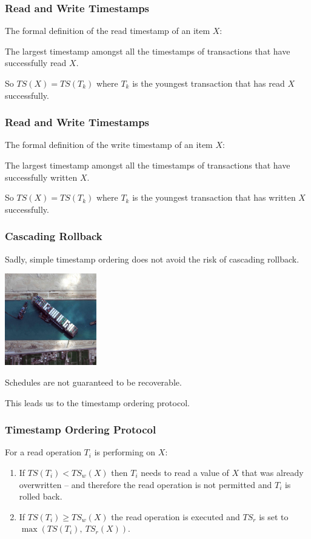 \begin{frame}
\frametitle{Read and Write Timestamps}

The formal definition of the read timestamp of an item $X$: 

The largest timestamp amongst all the timestamps of transactions that have successfully read $X$. 

So $T\!S(X) = T\!S(T_{k})$ where $T_{k}$ is the youngest transaction that has read $X$ successfully.
\end{frame}

\begin{frame}
\frametitle{Read and Write Timestamps}

The formal definition of the write timestamp of an item $X$: 

The largest timestamp amongst all the timestamps of transactions that have successfully written $X$. 

So $T\!S(X) = T\!S(T_{k})$ where $T_{k}$ is the youngest transaction that has written $X$ successfully.

\end{frame}

\begin{frame}
\frametitle{Cascading Rollback}

Sadly, simple timestamp ordering does not avoid the risk of cascading rollback. 

\begin{center}
	\includegraphics[width=0.3\textwidth]{images/suezcanal.jpg}
\end{center}

Schedules are not guaranteed to be recoverable. 

This leads us to the \alert{timestamp ordering protocol}.

\end{frame}



\begin{frame}
\frametitle{Timestamp Ordering Protocol}

For a read operation $T_{i}$ is performing on $X$:
\begin{enumerate}
	\item If $T\!S(T_{i}) < T\!S_{w}(X)$ then $T_{i}$ needs to read a value of $X$ that was already overwritten -- and therefore the read operation is not permitted and $T_{i}$ is rolled back.
	\item If $T\!S(T_{i}) \geq T\!S_{w}(X)$ the read operation is executed and $T\!S_{r}$ is set to $\max ( T\!S(T_{i}),~T\!S_{r}(X))$.
\end{enumerate}


\end{frame}


